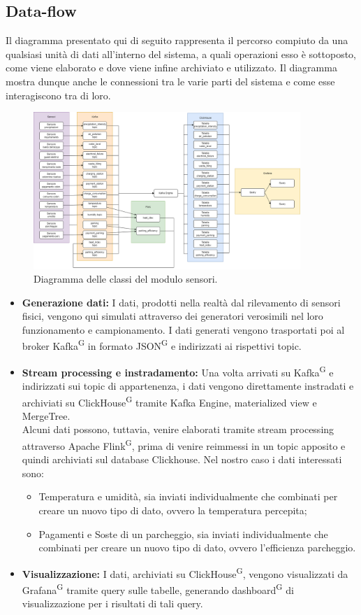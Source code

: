 \documentclass[8pt]{article}
\newcommand{\glossterm}[1]{#1\textsuperscript{G}} %
\begin{document}
\subsection{Data-flow}
Il diagramma presentato qui di seguito rappresenta il percorso compiuto da una qualsiasi unità di dati all'interno del sistema, a quali operazioni esso è sottoposto, come viene elaborato e dove viene infine archiviato e utilizzato. Il diagramma mostra dunque anche le connessioni tra le varie parti del sistema e come esse interagiscono tra di loro.
\begin{figure}[h!]
    \centering
    \includegraphics[width=0.9\textwidth]{images_st/flusso.png}
    \caption{Diagramma delle classi del modulo sensori.}
    \label{fig:Diagramma delle classi del modulo sensori}
\end{figure}
\begin{itemize}
    \item \textbf{Generazione dati:} I dati, prodotti nella realtà dal rilevamento di sensori fisici, vengono qui simulati attraverso dei generatori verosimili nel loro funzionamento e campionamento. I dati generati vengono trasportati poi al broker \glossterm{Kafka} in formato \glossterm{JSON} e indirizzati ai rispettivi topic.
    \item \textbf{Stream processing e instradamento:} Una volta arrivati su \glossterm{Kafka} e indirizzati sui topic di appartenenza, i dati vengono direttamente instradati e archiviati su \glossterm{ClickHouse} tramite Kafka Engine, materialized view e MergeTree. \\
    Alcuni dati possono, tuttavia, venire elaborati tramite stream processing attraverso Apache \glossterm{Flink}, prima di venire reimmessi in un topic apposito e quindi archiviati sul database Clickhouse. Nel nostro caso i dati interessati sono: 
    \begin{itemize}
    	\item Temperatura e umidità, sia inviati individualmente che combinati per creare un nuovo tipo di dato, ovvero la temperatura percepita;
    	\item Pagamenti e Soste di un parcheggio, sia inviati individualmente che combinati per creare un nuovo tipo di dato, ovvero l'efficienza parcheggio.
    \end{itemize}
    \item \textbf{Visualizzazione:} I dati, archiviati su \glossterm{ClickHouse}, vengono visualizzati da \glossterm{Grafana} tramite query sulle tabelle, generando \glossterm{dashboard} di visualizzazione per i risultati di tali query.
\end{itemize}
\clearpage
\end{document}
